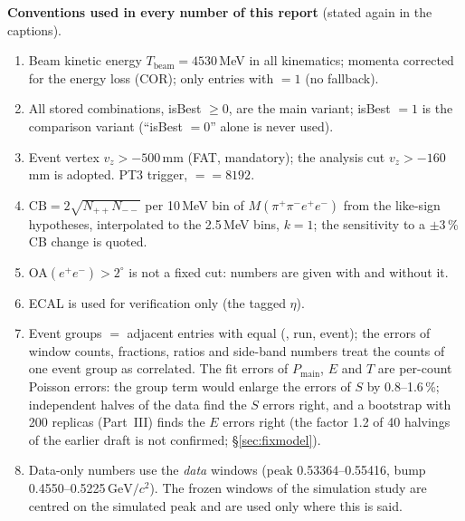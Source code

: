 \documentclass[11pt,a4paper]{article}
\newcommand{\ee}{\ensuremath{e^{+}e^{-}}\xspace}
\newcommand{\Mfour}{\ensuremath{M(\pi^{+}\pi^{-}e^{+}e^{-})}\xspace}
\newcommand{\GeVcc}{\ensuremath{\mathrm{GeV}/c^{2}}\xspace}
\newcommand{\code}[1]{\texttt{\detokenize{#1}}}
\newcommand{\Pmain}{\ensuremath{P_{\mathrm{main}}}\xspace}
\newcommand{\vz}{\ensuremath{v_z}\xspace}
\newcommand{\notebox}[1]{\par\noindent\colorbox{orange!10}{\parbox{\dimexpr\linewidth-2\fboxsep\relax}{#1}}\par}
\begin{document}
\notebox{\textbf{Conventions used in every number of this report} (stated again in the captions).
\begin{enumerate}
\setlength{\itemsep}{0pt}
\item Beam kinetic energy $T_{\mathrm{beam}}=4530$\,MeV in all kinematics; momenta corrected for the energy loss (COR);
      only entries with \code{cor_ok} $=1$ (no fallback).
\item All stored combinations, isBest $\ge0$, are the main variant; isBest $=1$ is the comparison
      variant (``isBest $=0$'' alone is never used).
\item Event vertex $\vz>-500$\,mm (FAT, mandatory); the analysis cut $\vz>-160$\,mm is adopted.
      PT3 trigger, \code{trigbit} $==8192$.
\item $\mathrm{CB}=2\sqrt{N_{++}N_{--}}$ per 10\,MeV bin of \Mfour from the like-sign hypotheses,
      interpolated to the 2.5\,MeV bins, $k=1$; the sensitivity to a $\pm3$\,\% CB change is quoted.
\item OA$(\ee)>2^\circ$ is not a fixed cut: numbers are given with and without it.
\item ECAL is used for verification only (the tagged $\eta$).
\item Event groups $=$ adjacent entries with equal (\code{file_id}, run, event); the errors of window counts,
      fractions, ratios and side-band numbers treat the counts of one event group as correlated. The fit
      errors of \Pmain, $E$ and $T$ are per-count Poisson errors: the group term would enlarge the errors of
      $S$ by 0.8--1.6\,\%; independent halves of the data find the $S$ errors right, and a bootstrap with 200 replicas
      (Part~III) finds the $E$ errors right (the factor 1.2 of 40 halvings of the earlier draft is not confirmed; \S\ref{sec:fixmodel}).
\item Data-only numbers use the \emph{data} windows (peak 0.53364--0.55416, bump 0.4550--0.5225\,\GeVcc).
      The frozen windows of the simulation study are centred on the simulated peak and are used only
      where this is said.
\end{enumerate}}
\end{document}
